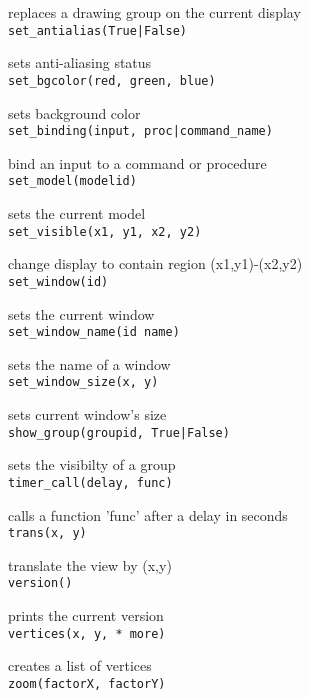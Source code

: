 replaces a drawing group on the current display \\


{\tt set\_antialias(True|False) }

sets anti-aliasing status \\


{\tt set\_bgcolor(red, green, blue) }

sets background color \\


{\tt set\_binding(input, proc|command\_name) }

bind an input to a command or procedure \\


{\tt set\_model(modelid) }

sets the current model \\


{\tt set\_visible(x1, y1, x2, y2) }

change display to contain region (x1,y1)-(x2,y2) \\


{\tt set\_window(id) }

sets the current window \\


{\tt set\_window\_name(id name) }

sets the name of a window \\


{\tt set\_window\_size(x, y) }

sets current window's size \\


{\tt show\_group(groupid, True|False) }

sets the visibilty of a group \\


{\tt timer\_call(delay, func) }

calls a function 'func' after a delay in seconds \\


{\tt trans(x, y) }

translate the view by (x,y) \\


{\tt version() }

prints the current version \\


{\tt vertices(x, y, * more) }

creates a list of vertices \\


{\tt zoom(factorX, factorY) }

